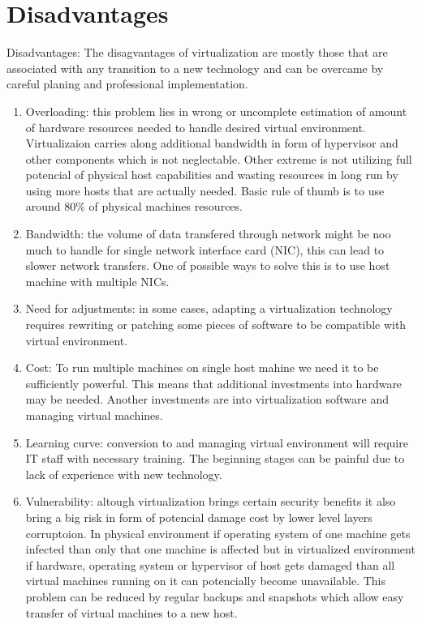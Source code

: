 \section{Disadvantages}
Disadvantages: 
The disagvantages of virtualization are mostly those that are associated with any transition to a new technology and can be overcame by careful planing and professional implementation.
\begin{enumerate}
\item Overloading: this problem lies in wrong or uncomplete estimation of amount of hardware resources needed to handle desired virtual environment. Virtualizaion carries along additional bandwidth in form of hypervisor and other components which is not neglectable. Other extreme is not utilizing full potencial of physical host capabilities and wasting resources in long run by using more hosts that are actually needed. Basic rule of thumb is to use around 80\% of physical machines resources.

\item Bandwidth: the volume of data transfered through network might be noo much to handle for single network interface card (NIC), this can lead to slower network transfers. One of possible ways to solve this is to use host machine with multiple NICs.

\item Need for adjustments: in some cases, adapting a virtualization technology requires rewriting or patching some pieces of software to be compatible with virtual environment. 

\item Cost: To run multiple machines on single host mahine we need it to be sufficiently powerful. This means that additional investments into hardware may be needed. Another investments are into virtualization software and managing virtual machines.

\item Learning curve: conversion to and managing virtual environment will require IT staff with necessary training. The beginning stages can be painful due to lack of experience with new technology.

\item Vulnerability: altough virtualization brings certain security benefits it also bring a big risk in form of potencial damage cost by lower level layers corruptoion. In physical environment if operating system of one machine gets infected than only that one machine is affected but in virtualized environment if hardware, operating system or hypervisor of host gets damaged than all virtual machines running on it can potencially become unavailable. This problem can be reduced by regular backups and snapshots which allow easy transfer of virtual machines to a new host.


\end{enumerate}
